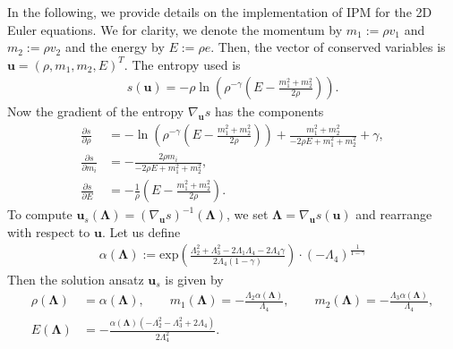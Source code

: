 In the following, we provide details on the implementation of IPM for the 2D Euler equations. We for clarity, we denote the momentum by $m_1 := \rho v_1$ and $m_2:=\rho v_2$ and the energy by $E:=\rho e$. Then, the vector of conserved variables is $\bm u = (\rho,m_1,m_2,E)^T$. The entropy used is
\begin{align*}
s(\bm u) = -\rho \ln \left(\rho^{-\gamma} \left(E - \frac{m_1^2 + m_2^2}{2
\rho}\right)\right).
\end{align*}
Now the gradient of the entropy $\nabla_{\bm u} s$ has the components
\begin{align*}
\frac{\partial s}{\partial \rho} &= -\ln \left(\rho^{-\gamma}\left(E-\frac{m_1^2+m_2^2}{2 \rho }\right)\right)+\frac{m_1^2+m_2^2}{-2 \rho  E+m_1^2+m_2^2}+\gamma, \\
\frac{\partial s}{\partial m_i} &= -\frac{2\rho  m_i}{-2 \rho  E+m_1^2+m_2^2}, \\
\frac{\partial s}{\partial E} &=-\frac1\rho\left(E-\frac{m_1^2+m_2^2}{2 \rho }\right).
\end{align*}
To compute $\bm u_s(\bm\Lambda) = (\nabla_{\bm u}s)^{-1}(\bm \Lambda)$, we set $\bm \Lambda = \nabla_{\bm u}s(\bm u)$ and rearrange with respect to $\bm u$. Let us define
\begin{align*}
\alpha(\bm\Lambda) := \text{exp}\left(\frac{ \Lambda_2^2 + \Lambda_3^2 - 2\Lambda_1  \Lambda_4 - 2 \Lambda_4  \gamma }{ 2 \Lambda_4(1-\gamma) } \right) \cdot (-\Lambda_4)^{\frac{1}{1-\gamma}}
\end{align*}
Then the solution ansatz $\bm u_s$ is given by
\begin{align*}
\rho(\bm\Lambda) &= \alpha(\bm\Lambda),\qquad m_1(\bm\Lambda) = -\frac{\Lambda_2 \alpha(\bm{\Lambda})}{\Lambda_4},\qquad m_2(\bm\Lambda) = -\frac{\Lambda_3 \alpha(\bm{\Lambda})}{\Lambda_4}, \\
E(\bm\Lambda) &= -\frac{  \alpha(\bm{\Lambda}) ( -\Lambda_2^2 - \Lambda_3^2 + 2\Lambda_4 ) }{ 2 \Lambda_4^2}.
\end{align*}
